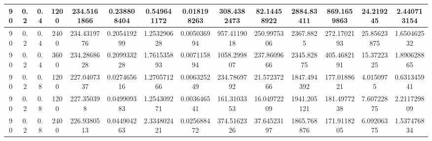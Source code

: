 \documentclass[main.tex]{subfiles}
\begin{document}
\begin{table}[ht]
\begin{tabular}{cccccccccccccc}
		\multicolumn{1}{|c|}{90} & \multicolumn{1}{c|}{0.2} & \multicolumn{1}{c|}{0.4} & \multicolumn{1}{c|}{1200} & \multicolumn{1}{c|}{234.5161866} & \multicolumn{1}{c|}{0.238808404} & \multicolumn{1}{c|}{0.549641172} & \multicolumn{1}{c|}{0.018198263} & \multicolumn{1}{c|}{308.4382473} & \multicolumn{1}{c|}{82.14458922} & \multicolumn{1}{c|}{2884.83411}  & \multicolumn{1}{c|}{869.1659863} & \multicolumn{1}{c|}{24.219245}   & \multicolumn{1}{c|}{2.440713154} \\ \hline
		\multicolumn{1}{|c|}{90} & \multicolumn{1}{c|}{0.2} & \multicolumn{1}{c|}{0.4} & \multicolumn{1}{c|}{2400} & \multicolumn{1}{c|}{234.4319776} & \multicolumn{1}{c|}{0.205419299} & \multicolumn{1}{c|}{1.253290628} & \multicolumn{1}{c|}{0.005036994} & \multicolumn{1}{c|}{957.4119018} & \multicolumn{1}{c|}{250.9975306} & \multicolumn{1}{c|}{2367.8825}   & \multicolumn{1}{c|}{272.1702193} & \multicolumn{1}{c|}{25.85623875} & \multicolumn{1}{c|}{1.650462532} \\ \hline
		\multicolumn{1}{|c|}{90} & \multicolumn{1}{c|}{0.2} & \multicolumn{1}{c|}{0.4} & \multicolumn{1}{c|}{3600} & \multicolumn{1}{c|}{234.2868628} & \multicolumn{1}{c|}{0.209933228} & \multicolumn{1}{c|}{1.761535893} & \multicolumn{1}{c|}{0.007115894} & \multicolumn{1}{c|}{1058.299807} & \multicolumn{1}{c|}{237.8609666} & \multicolumn{1}{c|}{2345.82875}  & \multicolumn{1}{c|}{405.4682191} & \multicolumn{1}{c|}{15.3722325}  & \multicolumn{1}{c|}{1.890628865} \\ \hline
		\multicolumn{1}{|c|}{90} & \multicolumn{1}{c|}{0.2} & \multicolumn{1}{c|}{0.8} & \multicolumn{1}{c|}{1200} & \multicolumn{1}{c|}{227.0407337} & \multicolumn{1}{c|}{0.027465616} & \multicolumn{1}{c|}{1.270571266} & \multicolumn{1}{c|}{0.006325249} & \multicolumn{1}{c|}{234.7869792} & \multicolumn{1}{c|}{21.57237266} & \multicolumn{1}{c|}{1847.494392} & \multicolumn{1}{c|}{177.0188621} & \multicolumn{1}{c|}{4.0150975}   & \multicolumn{1}{c|}{0.631345941} \\ \hline
		\multicolumn{1}{|c|}{90} & \multicolumn{1}{c|}{0.2} & \multicolumn{1}{c|}{0.8} & \multicolumn{1}{c|}{1200} & \multicolumn{1}{c|}{227.350398}  & \multicolumn{1}{c|}{0.049909383} & \multicolumn{1}{c|}{1.254309271} & \multicolumn{1}{c|}{0.003646541} & \multicolumn{1}{c|}{161.3103353} & \multicolumn{1}{c|}{16.04972209} & \multicolumn{1}{c|}{1941.205121} & \multicolumn{1}{c|}{181.4977238} & \multicolumn{1}{c|}{7.60722875}  & \multicolumn{1}{c|}{2.211729809} \\ \hline
		\multicolumn{1}{|c|}{90} & \multicolumn{1}{c|}{0.2} & \multicolumn{1}{c|}{0.8} & \multicolumn{1}{c|}{2400} & \multicolumn{1}{c|}{226.9380513} & \multicolumn{1}{c|}{0.044904263} & \multicolumn{1}{c|}{2.334802421} & \multicolumn{1}{c|}{0.025688472} & \multicolumn{1}{c|}{374.5162326} & \multicolumn{1}{c|}{37.64523197} & \multicolumn{1}{c|}{1865.768876} & \multicolumn{1}{c|}{171.9118205} & \multicolumn{1}{c|}{6.09206375}  & \multicolumn{1}{c|}{1.537476834} \\ \hline

\end{tabular}
\end{table}
\end{document}
